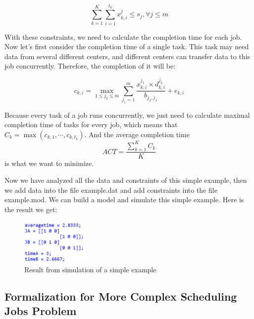 \documentclass{llncs}
\begin{document}
\begin{equation}\label{eq:slot}
    \sum_{k=1}^K\sum_{i=1}^{t_k} x_{k,i}^j\leq s_j,\forall j\leq m
\end{equation}

With these constraints, we need to calculate the completion time for each job. Now let's first consider the completion time of a single task. This task may need data from several different centers, and different centers can transfer data to this job concurrently. Therefore, the completion of it will be: 

\begin{equation}\label{eq:task}
    c_{k,i}=\max\limits_{1\leq j_2\leq m}\sum_{j_1=1}^m\frac{x_{k,i}^{j_1}\times d_{k,i}^{j_2}}{b_{j_2,j_1}}+e_{k,i}
\end{equation}

Because every task of a job runs concurrently, we just need to calculate maximal completion time of tasks for every job, which means that $C_k=\max(c_{k,1},\cdots,c_{k,t_k})$. And the average completion time 
\begin{equation}
    ACT=\frac{\sum_{k=1}^K C_k}K
\end{equation}
is what we want to minimize.

Now we have analyzed all the data and constraints of this simple example, then we add data into the file example.dat and add constraints into the file example.mod. We can build a model and simulate this simple example. Here is the result we get:
\begin{figure}[h]
    \centering
    \includegraphics[width=0.3\textwidth]{img/exampleresult.png}
    \caption{Result from simulation of a simple example}
    \label{fig:azure}
\end{figure}

\subsection{Formalization for More Complex Scheduling Jobs Problem}
\end{document}
